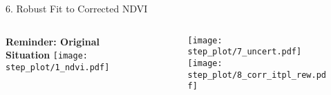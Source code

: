 \begin{frame}[t]{6. Robust Fit to Corrected NDVI}
    \begin{columns}
        \begin{column}{0.45\textwidth}
            \textbf{Reminder: Original Situation}
            \texttt{[image: step\_plot/1\_ndvi.pdf]}
        \end{column}
        \begin{column}{0.45\textwidth}
            \begin{figure}
                \vspace{-1.6cm}
                \texttt{[image: step\_plot/7\_uncert.pdf]}
                \texttt{[image: step\_plot/8\_corr\_itpl\_rew.pdf]}
            \end{figure}
        \end{column}
    \end{columns}
\end{frame}